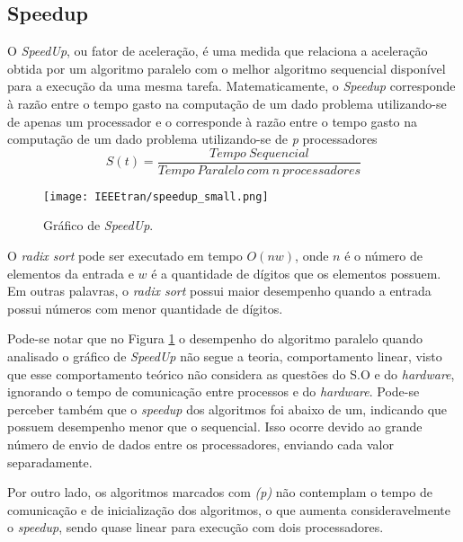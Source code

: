 \documentclass[journal]{IEEEtran}
\begin{document}
\subsection{Speedup}

O \textit{SpeedUp}, ou fator de aceleração, é uma medida que relaciona a aceleração obtida por um algoritmo paralelo com o melhor algoritmo sequencial disponível para a execução da uma mesma tarefa. Matematicamente, o \textit{Speedup} corresponde à razão entre o tempo gasto na computação de um dado problema utilizando-se de apenas um processador e o corresponde à razão entre o tempo gasto na computação de um dado problema utilizando-se de \textit{p} processadores
\begin{equation}
S(t) = \frac{Tempo\ Sequencial}{Tempo\ Paralelo\ com\ n\ processadores}   
\end{equation}

\begin{figure}[htb]
    \centering
    \texttt{[image: IEEEtran/speedup\_small.png]}
    \caption{Gráfico de \textit{SpeedUp}.}
    \label{fig:speedup}
\end{figure}


O \textit{radix sort} pode ser executado em tempo $O(nw)$, onde $n$ é o número de elementos da entrada e $w$ é a quantidade de dígitos que os elementos possuem. Em outras palavras, o \textit{radix sort} possui maior desempenho quando a entrada possui números com menor quantidade de dígitos.

Pode-se notar que no Figura \ref{fig:speedup} o desempenho do algoritmo paralelo quando analisado o gráfico de \textit{SpeedUp} não segue a teoria, comportamento linear, visto que esse comportamento teórico não considera as questões do S.O e do \textit{hardware}, ignorando o tempo de comunicação entre processos e do \textit{hardware}.
Pode-se perceber também que o \textit{speedup} dos algoritmos foi abaixo de um, indicando que possuem desempenho menor que o sequencial. Isso ocorre devido ao grande número de envio de dados entre os processadores, enviando cada valor separadamente. 

Por outro lado, os algoritmos marcados com \textit{(p)} não contemplam o tempo de comunicação e de inicialização dos algoritmos, o que aumenta consideravelmente o \textit{speedup}, sendo quase linear para execução com dois processadores. 
\end{document}
